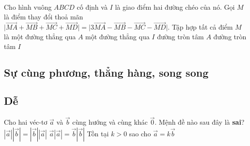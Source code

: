 \begin{ex}%
	Cho hình vuông $ABCD$ cố định và $I$ là giao điểm hai đường chéo của nó. Gọi $M$ là điểm thay đổi thoả mãn $\Big|\vec{MA}+\vec{MB}+\vec{MC}+\vec{MD}\Big|=\Big|3\vec{MA}-\vec{MB}-\vec{MC}-\vec{MD}\Big|$. Tập hợp tất cả điểm $M$ là
	\choice
	{một đường thẳng qua $A$}
	{một đường thẳng qua $I$}
	{đường tròn tâm $A$}
	{\True đường tròn tâm $I$}
\end{ex}

\subsection{Sự cùng phương, thẳng hàng, song song}

\subsection*{Dễ}

\begin{ex}%
	Cho hai véc-tơ  $\vec{a}$ và $\vec{b}$ cùng hướng và cùng khác $\vec{0}$. Mệnh đề nào sau đây là \textbf{sai}?
	{$\left|\vec{a}\right|\left|\vec{b}\right|=\left|\vec{b}\right|\left|\vec{a}\right|$}
	{\True $\vec{a}\left|\vec{a}\right|=\vec{b}\left|\vec{b}\right|$}
	{Tồn tại $k>0$ sao cho $\vec{a}=k\vec{b}$}
\end{ex}



